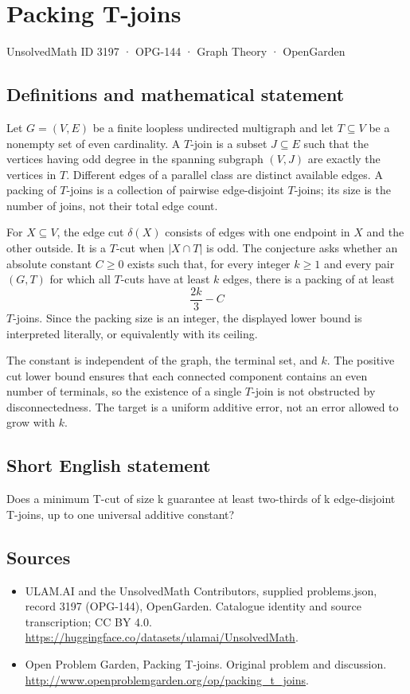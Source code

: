 \documentclass[11pt,a4paper]{article}
\begin{document}
\section*{Packing T-joins}\label{3197}
{\small UnsolvedMath ID 3197 · OPG-144 · Graph Theory · OpenGarden}
\subsection{Definitions and mathematical statement}
Let $G=(V,E)$ be a finite loopless undirected multigraph and let $T\subseteq V$ be a nonempty set of even cardinality. A $T$-join is a subset $J\subseteq E$ such that the vertices having odd degree in the spanning subgraph $(V,J)$ are exactly the vertices in $T$. Different edges of a parallel class are distinct available edges. A packing of $T$-joins is a collection of pairwise edge-disjoint $T$-joins; its size is the number of joins, not their total edge count.

For $X\subseteq V$, the edge cut $\delta(X)$ consists of edges with one endpoint in $X$ and the other outside. It is a $T$-cut when $|X\cap T|$ is odd. The conjecture asks whether an absolute constant $C\ge0$ exists such that, for every integer $k\ge1$ and every pair $(G,T)$ for which all $T$-cuts have at least $k$ edges, there is a packing of at least
\[
                         \frac{2k}{3}-C
\]
$T$-joins. Since the packing size is an integer, the displayed lower bound is interpreted literally, or equivalently with its ceiling.

The constant is independent of the graph, the terminal set, and $k$. The positive cut lower bound ensures that each connected component contains an even number of terminals, so the existence of a single $T$-join is not obstructed by disconnectedness. The target is a uniform additive error, not an error allowed to grow with $k$.
\subsection{Short English statement}
Does a minimum T-cut of size k guarantee at least two-thirds of k edge-disjoint T-joins, up to one universal additive constant?
\subsection{Sources}
\begin{itemize}
\item[S1] ULAM.AI and the UnsolvedMath Contributors, supplied problems.json, record 3197 (OPG-144), OpenGarden. Catalogue identity and source transcription; CC BY 4.0.
\url{https://huggingface.co/datasets/ulamai/UnsolvedMath}.
\item[S2] Open Problem Garden, Packing T-joins. Original problem and discussion.
\url{http://www.openproblemgarden.org/op/packing_t_joins}.
\end{itemize}
\end{document}
